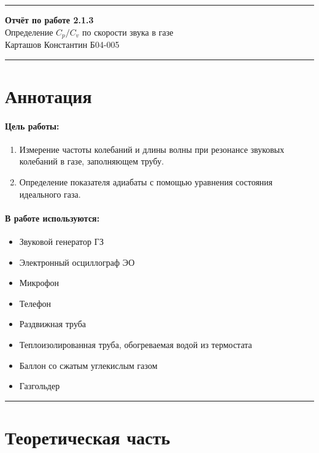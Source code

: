 \documentclass[a4paper,12pt]{article} %
\begin{document}
\hrule 	
\medskip
\begin{raggedright}
{\large \textbf{Отчёт по работе 2.1.3}}
\\
\medskip
{\Large Определение $C_p / C_v $ по скорости звука в газе} 
\\
\medskip
{\large Карташов Константин Б04-005}
\medskip
\hrule
\medskip
\end{raggedright}


\section{Аннотация}

\paragraph{Цель работы:}
\begin{enumerate}
\itemsep0em

\item Измерение частоты колебаний и длины волны при резонансе звуковых колебаний в газе, заполняющем трубу.
\item Определение показателя адиабаты с помощью уравнения состояния идеального газа.
\end{enumerate}

\paragraph{В работе используются:}
\begin{itemize}
\itemsep0em
\renewcommand{\labelitemi}{$\triangleright$}

\item Звуковой генератор ГЗ
\item Электронный осциллограф ЭО
\item Микрофон
\item Телефон
\item Раздвижная труба
\item Теплоизолированная труба, обогреваемая водой из термостата
\item Баллон со сжатым углекислым газом
\item Газгольдер
\end{itemize}



\medskip\hrule\medskip

\section{Теоретическая часть}
\end{document}
